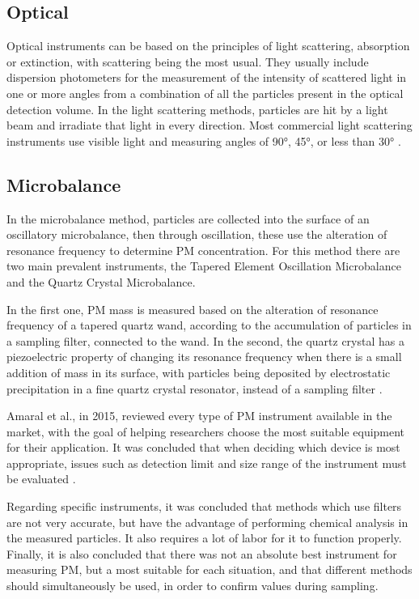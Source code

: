 

\subsection{Optical}

Optical instruments can be based on the principles of light scattering, absorption or extinction, with scattering being the most usual. They usually include dispersion photometers for the measurement of the intensity of scattered light in one or more angles from a combination of all the particles present in the optical detection volume. 
In the light scattering methods, particles are hit by a light beam and irradiate that light in every direction.
Most commercial light scattering instruments use visible light and measuring angles of 90°, 45°, or less than 30° \cite{Amaral2015}.


\subsection{Microbalance}

In the microbalance method, particles are collected into the surface of an oscillatory microbalance, then through oscillation, these use the alteration of resonance frequency to determine PM concentration.
For this method there are two main prevalent instruments, the Tapered Element Oscillation Microbalance and the Quartz Crystal Microbalance.

In the first one, PM mass is measured based on the alteration of resonance frequency of a tapered quartz wand, according to the accumulation of particles in a sampling filter, connected to the wand. In the second, the quartz crystal has a piezoelectric property of changing its resonance frequency when there is a small addition of mass in its surface, with particles being deposited by electrostatic precipitation in a fine quartz
crystal resonator, instead of a sampling filter \cite{Amaral2015}.

Amaral et al., in 2015, reviewed every type of PM instrument available in the market, with the goal of helping researchers choose the most suitable equipment for their application. It was concluded that when deciding which device is most appropriate, issues such as detection limit and size range of the instrument must be evaluated \cite{Amaral2015}. 

Regarding specific instruments, it was concluded that methods which use filters are not very accurate, but have the advantage of performing chemical analysis in the measured particles. It also requires a lot of labor for it to function properly. Finally, it is also concluded that there was not an absolute best instrument for measuring PM, but a most suitable for each situation, and that different methods should simultaneously be used, in order to confirm values during sampling.


